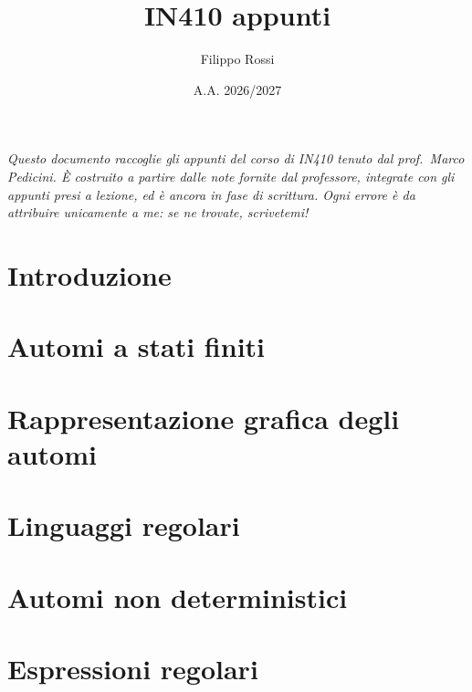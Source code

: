 \documentclass[12pt]{article}
\title{IN410 appunti}
\author{Filippo Rossi}
\date{A.A. 2026/2027}
\begin{document}
\maketitle

\begin{center}
\begin{minipage}{0.85\textwidth}
\itshape
Questo documento raccoglie gli appunti del corso di IN410 tenuto dal
prof.\ Marco Pedicini. È costruito a partire dalle note fornite dal professore,
integrate con gli appunti presi a lezione, ed è ancora in fase di scrittura.
Ogni errore è da attribuire unicamente a me: se ne trovate, scrivetemi!
\end{minipage}
\end{center}

\tableofcontents


\newpage 

\newpage 

\newpage 


\newpage


\section{Introduzione}


\newpage

\section{Automi a stati finiti}


\newpage


\section{Rappresentazione grafica degli automi}


\newpage


\section{Linguaggi regolari}

\newpage

\section{Automi non deterministici}

\newpage
\section{Espressioni regolari}

\end{document}
